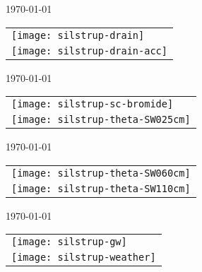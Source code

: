 \documentclass[a4paper]{article}
\begin{document}
\newpage
\today \\
%
\begin{tabular}{l}
\texttt{[image: silstrup-drain]} \\
\texttt{[image: silstrup-drain-acc]}
\end{tabular}

\newpage
\today \\
%
\begin{tabular}{l}
\texttt{[image: silstrup-sc-bromide]} \\
\texttt{[image: silstrup-theta-SW025cm]}
\end{tabular}

\newpage
\today \\
%
\begin{tabular}{l}
\texttt{[image: silstrup-theta-SW060cm]} \\
\texttt{[image: silstrup-theta-SW110cm]}
\end{tabular}

\newpage
\today \\
%
\begin{tabular}{l}
\texttt{[image: silstrup-gw]} \\
\texttt{[image: silstrup-weather]}
\end{tabular}
\end{document}
